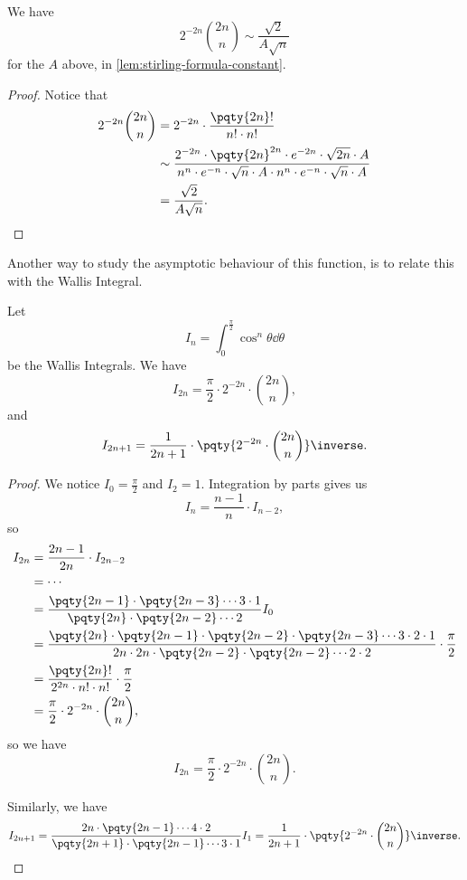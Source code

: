 \begin{lemma}
    \label{lem:asymptotic-binomial-factorial}%
    We have
    \[
        2^{-2n} \binom{2n}{n} \sim \frac{\sqrt{2}}{A \sqrt{n}}
    \]
    for the \(A\) above, in \autoref{lem:stirling-formula-constant}.
\end{lemma}

\begin{proof}
    Notice that
    \begin{align*}
        2^{-2n} \binom{2n}{n} &= 2^{-2n} \cdot \frac{\pqty{2n}!}{n! \cdot n!} \\
        &\sim \frac{2^{-2n} \cdot \pqty{2n}^{2n} \cdot e^{-2n} \cdot \sqrt{2n} \cdot A}{n^n \cdot e^{-n} \cdot \sqrt{n} \cdot A \cdot n^n \cdot e^{-n} \cdot \sqrt{n} \cdot A} \\
        &= \frac{\sqrt{2}}{A \sqrt{n}}.
    \end{align*}
\end{proof}

Another way to study the asymptotic behaviour of this function, is to relate this with the Wallis Integral.

\begin{lemma}
    \label{lem:wallis-integral}%
    Let
    \[
        I_n = \int_{0}^{\frac{\pi}{2}} \cos^n \theta \dd{\theta}
    \]
    be the Wallis Integrals. We have
    \[
        I_{2n} = \frac{\pi}{2} \cdot 2^{-2n} \cdot \binom{2n}{n},
    \]
    and
    \[
        I_{2n + 1} = \frac{1}{2n + 1} \cdot \pqty{2^{-2n} \cdot \binom{2n}{n}}\inverse.
    \]
\end{lemma}

\begin{proof}
    We notice \(I_0 = \frac{\pi}{2}\) and \(I_2 = 1\). Integration by parts gives us
    \[
        I_n = \frac{n - 1}{n} \cdot I_{n - 2},
    \]
    so
    \begin{align*}
        I_{2n} &= \frac{2n - 1}{2n} \cdot I_{2n - 2} \\
        &= \cdots \\
        &= \frac{\pqty{2n - 1} \cdot \pqty{2n - 3} \cdots 3 \cdot 1}{\pqty{2n} \cdot \pqty{2n - 2} \cdots 2} I_0 \\
        &= \frac{\pqty{2n} \cdot \pqty{2n - 1} \cdot \pqty{2n - 2} \cdot \pqty{2n - 3} \cdots 3 \cdot 2 \cdot 1}{2n \cdot 2n \cdot \pqty{2n - 2} \cdot \pqty{2n - 2} \cdots 2 \cdot 2} \cdot \frac{\pi}{2} \\
        &= \frac{\pqty{2n}!}{2^{2n} \cdot n! \cdot n!} \cdot \frac{\pi}{2} \\
        &= \frac{\pi}{2} \cdot 2^{-2n} \cdot \binom{2n}{n},
    \end{align*}
    so we have
    \[
        I_{2n} = \frac{\pi}{2} \cdot 2^{-2n} \cdot \binom{2n}{n}.
    \]

    Similarly, we have
    \[
        I_{2n + 1} = \frac{2n \cdot \pqty{2n - 1} \cdots 4 \cdot 2}{\pqty{2n + 1} \cdot \pqty{2n - 1} \cdots 3 \cdot 1} I_1 = \frac{1}{2n + 1} \cdot \pqty{2^{-2n} \cdot \binom{2n}{n}}\inverse.
    \]

\end{proof}

